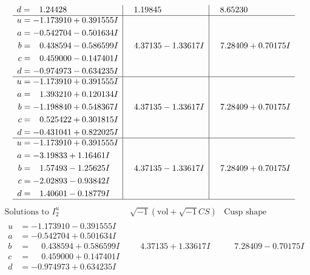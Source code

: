 \documentclass[1p]{elsarticle_modified}
\theoremstyle{definition}
\newcommand{\I}{\sqrt{-1}}
\begin{document}
$$\begin{array}{c|c|c}
\begin{aligned}
d &= \phantom{-}1.24428\phantom{ +0.000000I}\end{aligned}
 & \phantom{-}1.19845\phantom{ +0.000000I} & \phantom{-}8.65230\phantom{ +0.000000I} \\ \hline\begin{aligned}
u &= -1.173910 + 0.391555 I \\
a &= -0.542704 - 0.501634 I \\
b &= \phantom{-}0.438594 - 0.586599 I \\
c &= \phantom{-}0.459000 - 0.147401 I \\
d &= -0.974973 - 0.634235 I\end{aligned}
 & \phantom{-}4.37135 - 1.33617 I & \phantom{-}7.28409 + 0.70175 I \\ \hline\begin{aligned}
u &= -1.173910 + 0.391555 I \\
a &= \phantom{-}1.393210 + 0.120134 I \\
b &= -1.198840 + 0.548367 I \\
c &= \phantom{-}0.525422 + 0.301815 I \\
d &= -0.431041 + 0.822025 I\end{aligned}
 & \phantom{-}4.37135 - 1.33617 I & \phantom{-}7.28409 + 0.70175 I \\ \hline\begin{aligned}
u &= -1.173910 + 0.391555 I \\
a &= -3.19833 + 1.16461 I \\
b &= \phantom{-}1.57493 - 1.25625 I \\
c &= -2.02893 - 0.93842 I \\
d &= \phantom{-}1.40601 - 0.18779 I\end{aligned}
 & \phantom{-}4.37135 - 1.33617 I & \phantom{-}7.28409 + 0.70175 I\\
 \hline 
 \end{array}$$\newpage$$\begin{array}{c|c|c}  
\text{Solutions to }I^u_{2}& \I (\text{vol} + \sqrt{-1}CS) & \text{Cusp shape}\\
 \hline 
\begin{aligned}
u &= -1.173910 - 0.391555 I \\
a &= -0.542704 + 0.501634 I \\
b &= \phantom{-}0.438594 + 0.586599 I \\
c &= \phantom{-}0.459000 + 0.147401 I \\
d &= -0.974973 + 0.634235 I\end{aligned}
 & \phantom{-}4.37135 + 1.33617 I & \phantom{-}7.28409 - 0.70175 I \\ \hline\begin{aligned}

\end{aligned}
\end{array}$$
\end{document}
